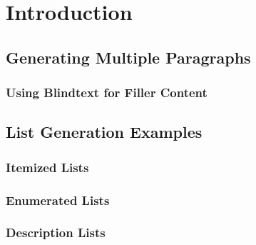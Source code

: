 \section{Introduction}\label{s:introduction}

\blindtext

\subsection{Generating Multiple Paragraphs}\label{ss:multiple_paragraphs}

\blindtext[2]

\subsubsection{Using Blindtext for Filler Content}\label{sss:blindtext_filler}


\subsection{List Generation Examples}\label{ss:list_examples}

\subsubsection{Itemized Lists}\label{sss:itemized_lists}

\blinditemize


\subsubsection{Enumerated Lists}\label{sss:enumerated_lists}

\blindenumerate


\subsubsection{Description Lists}\label{sss:description_lists}

